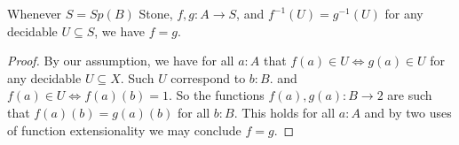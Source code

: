 \begin{lemma}
  Whenever $S = Sp(B)$ Stone, $f,g: A \to S$, and $f^{-1}(U) = g^{-1}(U)$ for any decidable 
  $U\subseteq S$, we have $f = g$. 
\end{lemma}
\begin{proof}
  By our assumption, we have for all $a:A$ that $f(a) \in U \iff g(a) \in U$ for 
  any decidable $U\subseteq X$. Such $U$ correspond to $b:B$.
  and $f(a) \in U \iff f(a)(b)  = 1$. 
  So the functions $f(a),g(a):B \to 2$ are such that 
  $f(a) (b) = g(a) (b)$ for all $b:B$. 
  This holds for all $a:A$ and by two uses of function extensionality we may conclude 
  $f=g$. 
\end{proof}


